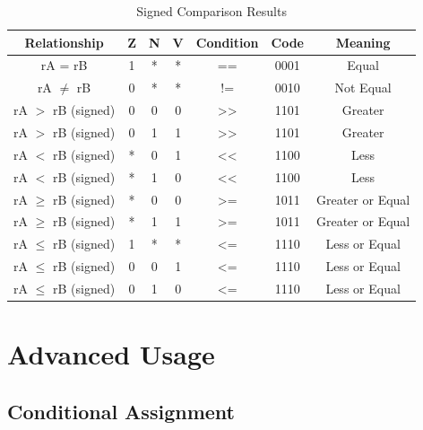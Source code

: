 \begin{table}[H]
	\centering
	\begin{tabular}{ccccccc}
		\toprule
		\textbf{Relationship} & \textbf{Z} & \textbf{N} & \textbf{V} & \textbf{Condition} & \textbf{Code} & \textbf{Meaning} \\
		\midrule
		rA = rB               & 1          & *          & *          & ==                 & 0001          & Equal            \\
		rA $\neq$ rB          & 0          & *          & *          & !=                 & 0010          & Not Equal        \\
		rA $>$ rB (signed)    & 0          & 0          & 0          & >>                 & 1101          & Greater          \\
		rA $>$ rB (signed)    & 0          & 1          & 1          & >>                 & 1101          & Greater          \\
		rA $<$ rB (signed)    & *          & 0          & 1          & <<                 & 1100          & Less             \\
		rA $<$ rB (signed)    & *          & 1          & 0          & <<                 & 1100          & Less             \\
		rA $\geq$ rB (signed) & *          & 0          & 0          & >=                 & 1011          & Greater or Equal \\
		rA $\geq$ rB (signed) & *          & 1          & 1          & >=                 & 1011          & Greater or Equal \\
		rA $\leq$ rB (signed) & 1          & *          & *          & <=                 & 1110          & Less or Equal    \\
		rA $\leq$ rB (signed) & 0          & 0          & 1          & <=                 & 1110          & Less or Equal    \\
		rA $\leq$ rB (signed) & 0          & 1          & 0          & <=                 & 1110          & Less or Equal    \\
		\bottomrule
	\end{tabular}
	\caption{Signed Comparison Results}
\end{table}

\section{Advanced Usage}

\subsection{Conditional Assignment}

